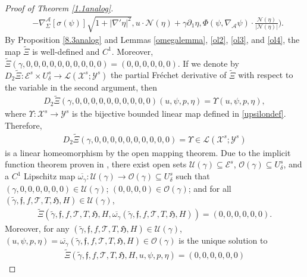 \documentclass[11pt,letterpaper,reqno]{amsart}
\numberwithin{equation}{section}
\newcommand{\abs}[1]{\left\lvert#1\right\rvert}
\begin{document}
\begin{proof}[Proof of Theorem \ref{1.1analog}]
\begin{align}
     &-\nabla_{\Sigma}^{\mathcal{A}}[\sigma(\psi)]\sqrt{1+\abs{\nabla'\eta}^{2}},u \cdot \mathcal{N}(\eta)+\gamma \partial_{1}\eta,\Phi(\psi,\nabla_{\mathcal{A}}\psi)\cdot\frac{\mathcal{N}(\eta)}{\abs{\mathcal{N}(\eta)}}).
 \end{align}
 By Proposition \ref{8.3analog} and Lemmas \ref{omegalemma}, \ref{ol2}, \ref{ol3}, and \ref{ol4}, the map \(\widetilde{\Xi}\) is well-defined and \(C^{1}\). Moreover, \(\widetilde{\Xi}(\gamma,0,0,0,0,0,0,0,0,0,0)=(0,0,0,0,0,0)\). If we denote by \(D_{2}\widetilde{\Xi}:\mathcal{E}^{s} \times U_{\delta}^{s} \to \mathcal{L}(\mathcal{X}^{s};\mathcal{Y}^{s})\) the partial Fr\'echet derivative of \(\widetilde{\Xi}\) with respect to the variable in the second argument, then
 \begin{align}
     D_{2}\widetilde{\Xi}(\gamma,0,0,0,0,0,0,0,0,0,0)(u,\psi,p,\eta)=\Upsilon(u,\psi,p,\eta),
 \end{align}
 where \(\Upsilon:\mathcal{X}^{s} \to \mathcal{Y}^{s}\) is the bijective bounded linear map defined in \eqref{upsilondef}. Therefore,
 \begin{align}
     D_{2}\widetilde{\Xi}(\gamma,0,0,0,0,0,0,0,0,0,0)=\Upsilon\in \mathcal{L}(\mathcal{X}^{s};\mathcal{Y}^{s})
 \end{align}
 is a linear homeomorphism by the open mapping theorem. Due to the implicit function theorem proven in \cite{abraham2012manifolds}, there exist open sets \(\mathcal{U}(\gamma) \subseteq \mathcal{E}^{s}\), \(\mathcal{O}(\gamma) \subseteq U_{\delta}^{s}\), and a \(C^{1}\) Lipschitz map \(\overline{\omega_{\gamma}}:\mathcal{U}(\gamma) \to \mathcal{O}(\gamma) \subseteq U_{\delta}^{s}\) such that \((\gamma,0,0,0,0,0,0) \in \mathcal{U}(\gamma)\); \((0,0,0,0) \in \mathcal{O}(\gamma)\); and for all \((\widetilde{\gamma},\mathfrak{f},f, \mathcal{T},T,\mathfrak{H},H) \in \mathcal{U}(\gamma)\),
 \begin{align}
     \widetilde{\Xi}(\widetilde{\gamma},\mathfrak{f},f, \mathcal{T},T,\mathfrak{H},H,\overline{\omega_{\gamma}}(\widetilde{\gamma},\mathfrak{f},f, \mathcal{T},T,\mathfrak{H},H))=(0,0,0,0,0,0).
 \end{align}
 Moreover, for any \((\widetilde{\gamma},\mathfrak{f},f, \mathcal{T},T,\mathfrak{H},H) \in \mathcal{U}(\gamma)\), \((u,\psi,p,\eta)=\overline{\omega_{\gamma}}(\widetilde{\gamma},\mathfrak{f},f, \mathcal{T},T,\mathfrak{H},H) \in \mathcal{O}(\gamma)\) is the unique solution to
 \begin{align}
     \widetilde{\Xi}(\widetilde{\gamma},\mathfrak{f},f, \mathcal{T},T,\mathfrak{H},H,u,\psi,p,\eta)=(0,0,0,0,0,0)

\end{align}
\end{proof}
\end{document}
